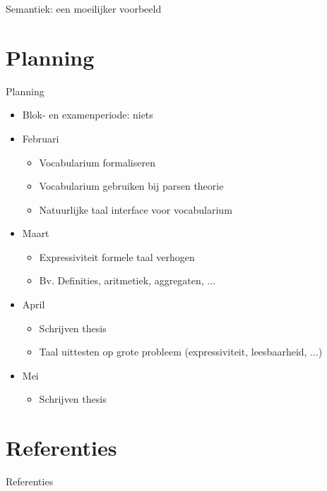 \documentclass[notes, dvipsnames]{beamer}
\newcommand{\hitem}{
	\ppause
	\item
}
\newcommand{\ppause}{\onslide<+>}
\newcommand{\attention}[1]{\textcolor{ForestGreen}{#1}}
\begin{document}
	\begin{frame}{Semantiek: een moeilijker voorbeeld}
	\end{frame}

  \section{Planning}
  \begin{frame}{Planning}
			\begin{itemize}
        \hitem Blok- en examenperiode: niets
        \hitem Februari
          \begin{itemize}
            \item Vocabularium formaliseren
            \item Vocabularium gebruiken bij parsen theorie
            \item Natuurlijke taal interface voor vocabularium
          \end{itemize}
        \hitem Maart
          \begin{itemize}
            \item Expressiviteit formele taal verhogen
            \item Bv. Definities, aritmetiek, aggregaten, ...
          \end{itemize}
        \hitem April
          \begin{itemize}
            \item Schrijven thesis
            \item Taal uittesten op grote probleem (expressiviteit, leesbaarheid, ...)
          \end{itemize}
        \hitem Mei
          \begin{itemize}
            \item Schrijven thesis
          \end{itemize}
			\end{itemize}
  \end{frame}
			
	\section{Referenties}
	\begin{frame}[allowframebreaks]{Referenties}
		
		
	\end{frame}
	
\end{document}
